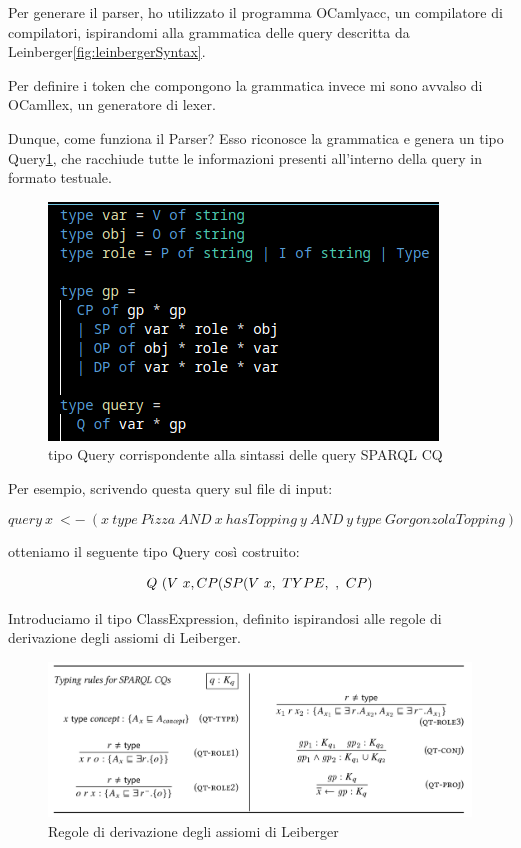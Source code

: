 Per generare il parser, ho utilizzato il programma OCamlyacc, un compilatore di compilatori, ispirandomi alla grammatica delle query descritta da Leinberger\ref{fig:leinbergerSyntax}. 

Per definire i token che compongono la grammatica invece mi sono avvalso di OCamllex, un generatore di lexer.


Dunque, come funziona il Parser? Esso riconosce la grammatica e genera un tipo Query\ref{fig:querType}, che racchiude tutte le informazioni presenti all'interno della query in formato testuale. 

\begin{figure}[H]
    \centering
    \includegraphics[scale=0.7]{pictures/queryType.png}
    \caption{tipo Query corrispondente alla sintassi delle query SPARQL CQ}
    \label{fig:querType}
\end{figure}


Per esempio, scrivendo questa query sul file di input:

\[ query \ x \ <- \ (x \ type \ Pizza \ AND \ x \ hasTopping \ y \ AND \ y \ type \ GorgonzolaTopping) \]

otteniamo il seguente tipo Query così costruito: 

\[ Q \  (V \ x, \\
    CP(SP(V \ x,\ TYPE, \ ,\ CP)\]

Introduciamo il tipo ClassExpression, definito ispirandosi alle regole di derivazione degli assiomi di Leiberger.
\begin{figure}[H]
    \centering
    \includegraphics[width=\textwidth]{pictures/leinbergAxiom.png}
    \caption{Regole di derivazione degli assiomi di Leiberger}
    \label{fig:leinbergerAxiom}
\end{figure}

